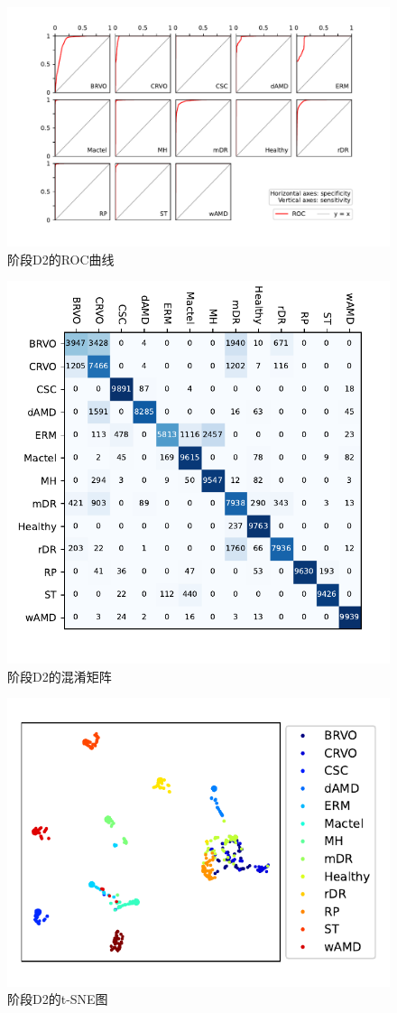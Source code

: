 \documentclass{article}
\begin{document}
	
	\begin{figure}[htbp]
		\centering
		\includegraphics[width=\linewidth]{Figs/diagnosis2_ROC.pdf}
		\vspace{-0.8cm}
		\caption{阶段D2的ROC曲线}
		\label{fig:D2_ROC}
	\end{figure}
	
	\begin{figure}[H]
		\centering
		\includegraphics[width=0.7\linewidth]{Figs/diagnosis2_confusion_matrix.pdf}
		\vspace{-0.8cm}
		\caption{阶段D2的混淆矩阵}
		\label{fig:D2_conf_mat}
	\end{figure}
	
	\begin{figure}[H]
		\centering
		\includegraphics[width=0.65\linewidth]{Figs/diagnosis2_tSNE.pdf}
		\vspace{-0.3cm}
		\caption{阶段D2的t-SNE图}
		\label{fig:D2_tSNE}
	\end{figure}
	
\end{document}
